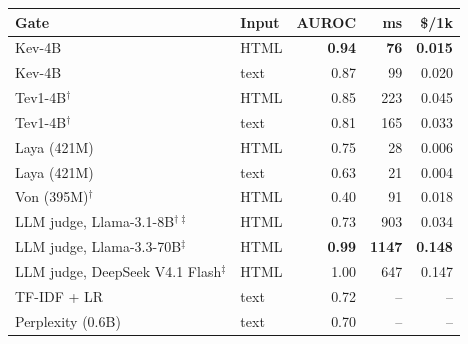 \begin{tabular}{llrrr}\toprule
Gate & Input & AUROC & ms & \$/1k \\ \midrule
Kev-4B & HTML & \textbf{0.94} & \textbf{76} & \textbf{0.015} \\
Kev-4B & text & 0.87 & 99 & 0.020 \\
Tev1-4B$^{\dagger}$ & HTML & 0.85 & 223 & 0.045 \\
Tev1-4B$^{\dagger}$ & text & 0.81 & 165 & 0.033 \\
Laya (421M) & HTML & 0.75 & 28 & 0.006 \\
Laya (421M) & text & 0.63 & 21 & 0.004 \\
Von (395M)$^{\dagger}$ & HTML & 0.40 & 91 & 0.018 \\
LLM judge, Llama-3.1-8B$^{\dagger \ddagger}$ & HTML & 0.73 & 903 & 0.034 \\
LLM judge, Llama-3.3-70B$^{\ddagger}$ & HTML & \textbf{0.99} & \textbf{1147} & \textbf{0.148} \\
LLM judge, DeepSeek V4.1 Flash$^{\ddagger}$ & HTML & 1.00 & 647 & 0.147 \\
TF-IDF + LR & text & 0.72 & -- & -- \\
Perplexity (0.6B) & text & 0.70 & -- & -- \\
\bottomrule\end{tabular}
